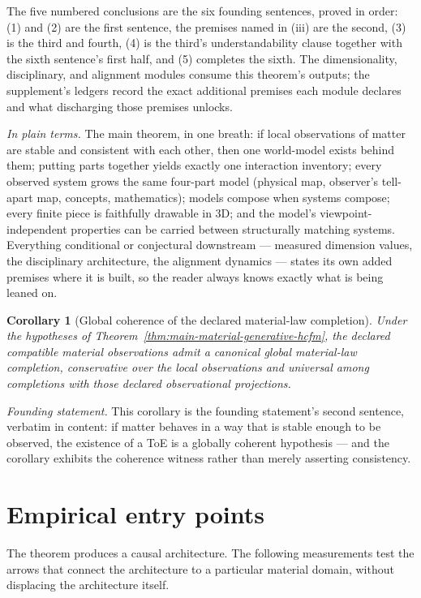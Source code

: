 \documentclass[11pt]{article}
\newtheorem{corollary}{Corollary}
\theoremstyle{definition}
\newcommand{\plainterms}{\emph{In plain terms.}}
\newcommand{\founding}{\emph{Founding statement.}}
\begin{document}
The five numbered conclusions are the six founding sentences, proved in order: (1) and (2) are the first sentence, the premises named in (iii) are the second, (3) is the third and fourth, (4) is the third's understandability clause together with the sixth sentence's first half, and (5) completes the sixth. The dimensionality, disciplinary, and alignment modules consume this theorem's outputs; the supplement's ledgers record the exact additional premises each module declares and what discharging those premises unlocks.

\noindent\plainterms{} The main theorem, in one breath: if local observations of matter are stable and consistent with each other, then one world-model exists behind them; putting parts together yields exactly one interaction inventory; every observed system grows the same four-part model (physical map, observer's tell-apart map, concepts, mathematics); models compose when systems compose; every finite piece is faithfully drawable in 3D; and the model's viewpoint-independent properties can be carried between structurally matching systems. Everything conditional or conjectural downstream --- measured dimension values, the disciplinary architecture, the alignment dynamics --- states its own added premises where it is built, so the reader always knows exactly what is being leaned on.

\begin{corollary}[Global coherence of the declared material-law completion] 
\label{cor:declared-material-law-coherence}
Under the hypotheses of Theorem~\ref{thm:main-material-generative-hcfm}, the declared compatible material observations admit a canonical global material-law completion, conservative over the local observations and universal among completions with those declared observational projections.
\end{corollary}

\noindent\founding{} This corollary is the founding statement's second sentence, verbatim in content: if matter behaves in a way that is stable enough to be observed, the existence of a ToE is a globally coherent hypothesis --- and the corollary exhibits the coherence witness rather than merely asserting consistency.

\section{Empirical entry points}

The theorem produces a causal architecture. The following measurements test the arrows that connect the architecture to a particular material domain, without displacing the architecture itself.
\end{document}
